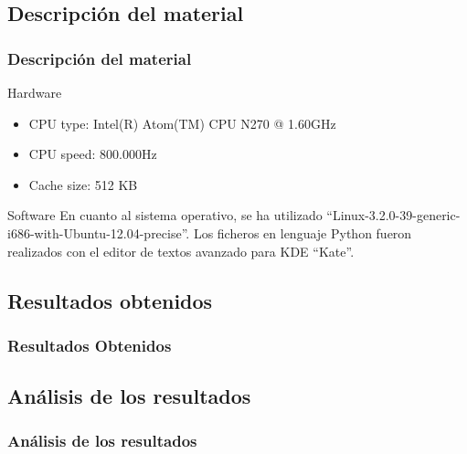 \documentclass{beamer}
\begin{document}
\subsection{Descripción del material}

\begin{frame}

  \frametitle{Descripción del material}
  
  \begin{block}{Hardware}
    \begin{itemize}
      \item CPU type: Intel(R) Atom(TM) CPU N270   @ 1.60GHz
      \item CPU speed: 800.000Hz
      \item Cache size: 512 KB
    \end{itemize}
  \end{block}

  \begin{block}{Software}
    En cuanto al sistema operativo, se ha utilizado ``Linux-3.2.0-39-generic-i686-with-Ubuntu-12.04-precise''.
    Los ficheros en lenguaje Python fueron realizados con el editor de textos avanzado para KDE ``Kate''.
  \end{block}

\end{frame}

\subsection{Resultados obtenidos}

\begin{frame}
  
  \frametitle{Resultados Obtenidos}
  
  
  

\end{frame}

\subsection{Análisis de los resultados}

\begin{frame}

  \frametitle{Análisis de los resultados}
  
  
  

\end{frame}
\end{document}
